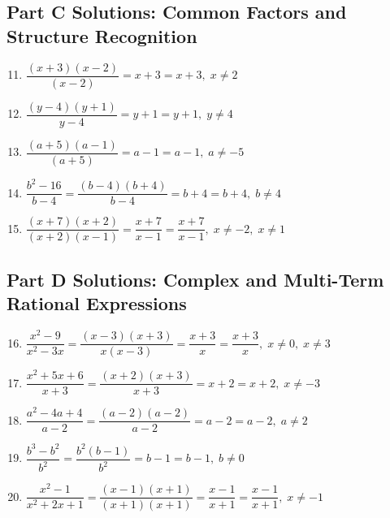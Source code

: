 \documentclass[12pt]{article}
\begin{document}
\subsection*{Part C Solutions: Common Factors and Structure Recognition}
\begin{enumerate}
  \setcounter{enumi}{10}
  \item \(\dfrac{(x+3)(x-2)}{(x-2)}
  = x+3
  = \boxed{x+3}, \; x \ne 2\)

  \item \(\dfrac{(y-4)(y+1)}{y-4}
  = y+1
  = \boxed{y+1}, \; y \ne 4\)

  \item \(\dfrac{(a+5)(a-1)}{(a+5)}
  = a-1
  = \boxed{a-1}, \; a \ne -5\)

  \item \(\dfrac{b^2 - 16}{b - 4}
  = \dfrac{(b-4)(b+4)}{b-4}
  = b+4
  = \boxed{b+4}, \; b \ne 4\)

  \item \(\dfrac{(x+7)(x+2)}{(x+2)(x-1)}
  = \dfrac{x+7}{x-1}
  = \boxed{\dfrac{x+7}{x-1}}, \; x \ne -2,\; x \ne 1\)
\end{enumerate}

\subsection*{Part D Solutions: Complex and Multi-Term Rational Expressions}
\begin{enumerate}
  \setcounter{enumi}{15}
  \item \(\dfrac{x^2 - 9}{x^2 - 3x}
  = \dfrac{(x-3)(x+3)}{x(x-3)}
  = \dfrac{x+3}{x}
  = \boxed{\dfrac{x+3}{x}}, \; x \ne 0,\; x \ne 3\)

  \item \(\dfrac{x^2 + 5x + 6}{x + 3}
  = \dfrac{(x+2)(x+3)}{x+3}
  = x+2
  = \boxed{x+2}, \; x \ne -3\)

  \item \(\dfrac{a^2 - 4a + 4}{a - 2}
  = \dfrac{(a-2)(a-2)}{a-2}
  = a-2
  = \boxed{a-2}, \; a \ne 2\)

  \item \(\dfrac{b^3 - b^2}{b^2}
  = \dfrac{b^2(b-1)}{b^2}
  = b-1
  = \boxed{b-1}, \; b \ne 0\)

  \item \(\dfrac{x^2 - 1}{x^2 + 2x + 1}
  = \dfrac{(x-1)(x+1)}{(x+1)(x+1)}
  = \dfrac{x-1}{x+1}
  = \boxed{\dfrac{x-1}{x+1}}, \; x \ne -1\)
\end{enumerate}
\end{document}
